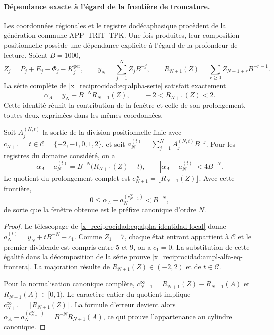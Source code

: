 

\paragraph{Dépendance exacte à l'égard de la frontière de troncature.}
\label{x_reciprocidad:ampl-alfa-frontera-exacta}
Les coordonnées régionales et le registre dodécaphasique procèdent de la
génération commune APP--TRIT--TPK. Une fois produites, leur composition
positionnelle possède une dépendance explicite à l'égard de la profondeur
de lecture. Soient $B=1000$,
\[
 Z_j=P_j+E_j-\Phi_j-K_j^{\mathrm{per}},\qquad
 y_N=\sum_{j=1}^{N}Z_jB^{-j},\qquad
 R_{N+1}(Z)=\sum_{r\geq0}Z_{N+1+r}B^{-r-1}.
\]
La série complète de \eqref{x_reciprocidad:eq:alpha-serie} satisfait exactement
\[
 \alpha_A=y_N+B^{-N}R_{N+1}(Z),\qquad
 -2<R_{N+1}(Z)<2.
\]
Cette identité réunit la contribution de la fenêtre et celle de son
prolongement, toutes deux exprimées dans les mêmes coordonnées.

\begin{proposition}
\label{x_reciprocidad:ampl-alfa-prop-frontera}
Soit $A_j^{(N,t)}$ la sortie de la division positionnelle finie avec
$c_{N+1}=t\in\mathcal C=\{-2,-1,0,1,2\}$, et soit
$a_N^{(t)}=\sum_{j=1}^{N}A_j^{(N,t)}B^{-j}$. Pour les registres du
domaine considéré, on a
\begin{equation}
 \alpha_A-a_N^{(t)}
 =B^{-N}\bigl(R_{N+1}(Z)-t\bigr),
 \qquad
 |\alpha_A-a_N^{(t)}|<4B^{-N}.
 \label{x_reciprocidad:ampl-alfa-eq-frontera}
\end{equation}
Le quotient du prolongement complet est
$c_{N+1}^{\infty}=\lfloor R_{N+1}(Z)\rfloor$. Avec cette frontière,
\[
 0\leq\alpha_A-a_N^{(c_{N+1}^{\infty})}<B^{-N},
\]
de sorte que la fenêtre obtenue est le préfixe canonique d'ordre $N$.
\end{proposition}
\begin{proof}
Le télescopage de \eqref{x_reciprocidad:eq:alpha-identidad-local} donne
$a_N^{(t)}=y_N+tB^{-N}-c_1$. Comme $Z_1=7$, chaque état entrant
appartient à $\mathcal C$ et le premier dividende est compris entre $5$ et $9$,
on a $c_1=0$. La substitution de cette égalité dans la décomposition de la
série prouve \eqref{x_reciprocidad:ampl-alfa-eq-frontera}. La majoration résulte de
$R_{N+1}(Z)\in(-2,2)$ et de $t\in\mathcal C$.

Pour la normalisation canonique complète,
$c_{N+1}^{\infty}=R_{N+1}(Z)-R_{N+1}(A)$ et
$R_{N+1}(A)\in[0,1)$. Le caractère entier du quotient implique
$c_{N+1}^{\infty}=\lfloor R_{N+1}(Z)\rfloor$. La formule d'erreur
devient alors
$\alpha_A-a_N^{(c_{N+1}^{\infty})}=B^{-N}R_{N+1}(A)$, ce qui prouve
l'appartenance au cylindre canonique.
\end{proof}

